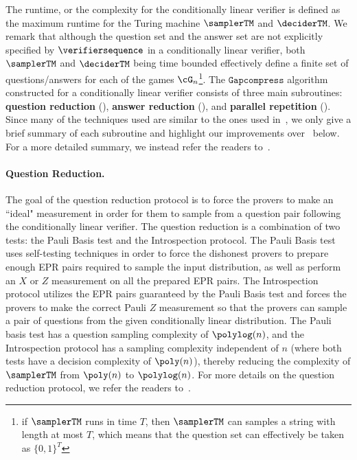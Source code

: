 The runtime, or the complexity for the conditionally linear verifier is defined as the maximum runtime for the Turing machine $\samplerTM$ and $\deciderTM$. We remark that although the question set and the answer set are not explicitly specified by $\verifiersequence$ in a conditionally linear verifier, both $\samplerTM$ and $\deciderTM$ being time bounded effectively define a finite set of questions/answers for each of the games $\cG_n$\footnote{if $\samplerTM$ runs in time $T$, then $\samplerTM$ can samples a string with length at most $T$, which means that the question set can effectively be taken as $\{0,1\}^T$}. The $\texttt{Gapcompress}$ algorithm constructed for a conditionally linear verifier consists of three main subroutines:  \textbf{question reduction} (), \textbf{answer reduction} (), and \textbf{parallel repetition} (). Since many of the techniques used are similar to the ones used in~\cite{jiMIPRE2022a}, we only give a brief summary of each subroutine and highlight our improvements over~\cite{jiMIPRE2022a} below. For a more detailed summary, we instead refer the readers to~\cite[Chapter 2]{jiMIPRE2022a}.

\paragraph{Question Reduction. } The goal of the question reduction protocol is to force the provers to make an ``ideal" measurement in order for them to sample from a question pair following the conditionally linear verifier. The question reduction is a combination of two tests: the Pauli Basis test and the Introspection protocol. The Pauli Basis test uses self-testing techniques in order to force the dishonest provers to prepare enough EPR pairs required to sample the input distribution, as well as perform an $X$ or $Z$ measurement on all the prepared EPR pairs. The Introspection protocol utilizes the EPR pairs guaranteed by the Pauli Basis test and forces the provers to make the correct Pauli $Z$ measurement so that the provers can sample a pair of questions from the given conditionally linear distribution. The Pauli basis test has a question sampling complexity of $\polylog(n)$, and the Introspection protocol has a sampling complexity independent of $n$ (where both tests have a decision complexity of $\poly(n)$), thereby reducing the complexity of $\samplerTM$ from $\poly(n)$ to $\polylog(n)$. For more details on the question reduction protocol, we refer the readers to~. 

